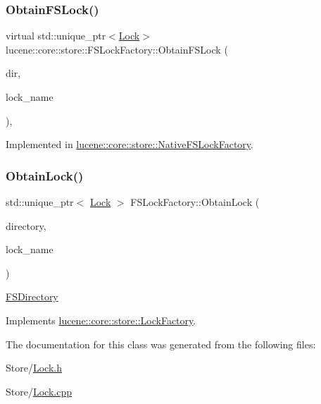 \subsubsection{\texorpdfstring{Obtain\+F\+S\+Lock()}{ObtainFSLock()}}
{\footnotesize\ttfamily virtual std\+::unique\+\_\+ptr$<$\mbox{\hyperlink{classlucene_1_1core_1_1store_1_1Lock}{Lock}}$>$ lucene\+::core\+::store\+::\+F\+S\+Lock\+Factory\+::\+Obtain\+F\+S\+Lock (\begin{DoxyParamCaption}\item[{\mbox{\hyperlink{classlucene_1_1core_1_1store_1_1FSDirectory}{F\+S\+Directory}} \&}]{dir,  }\item[{\mbox{\hyperlink{ZlibCrc32_8h_a2c212835823e3c54a8ab6d95c652660e}{const}} std\+::string \&}]{lock\+\_\+name }\end{DoxyParamCaption})\hspace{0.3cm}{\ttfamily [protected]}, {}}



Implemented in \mbox{\hyperlink{classlucene_1_1core_1_1store_1_1NativeFSLockFactory_af41d7358d9d8b4dab47bc4a443ddd1ee}{lucene\+::core\+::store\+::\+Native\+F\+S\+Lock\+Factory}}.

\mbox{\label{classlucene_1_1core_1_1store_1_1FSLockFactory_a27bb42e846edf5f69913b78ccdf3208e}} 
\subsubsection{\texorpdfstring{Obtain\+Lock()}{ObtainLock()}}
{\footnotesize\ttfamily std\+::unique\+\_\+ptr$<$ \mbox{\hyperlink{classlucene_1_1core_1_1store_1_1Lock}{Lock}} $>$ F\+S\+Lock\+Factory\+::\+Obtain\+Lock (\begin{DoxyParamCaption}\item[{\mbox{\hyperlink{classlucene_1_1core_1_1store_1_1Directory}{Directory}} \&}]{directory,  }\item[{\mbox{\hyperlink{ZlibCrc32_8h_a2c212835823e3c54a8ab6d95c652660e}{const}} std\+::string \&}]{lock\+\_\+name }\end{DoxyParamCaption})\hspace{0.3cm}{\ttfamily [virtual]}}

\mbox{\hyperlink{classlucene_1_1core_1_1store_1_1FSDirectory}{F\+S\+Directory}} 

Implements \mbox{\hyperlink{classlucene_1_1core_1_1store_1_1LockFactory_a46f215414ef4714b6dc3298ddbd352f8}{lucene\+::core\+::store\+::\+Lock\+Factory}}.



The documentation for this class was generated from the following files\+:\begin{DoxyCompactItemize}
\item 
Store/\mbox{\hyperlink{Lock_8h}{Lock.\+h}}\item 
Store/\mbox{\hyperlink{Lock_8cpp}{Lock.\+cpp}}\end{DoxyCompactItemize}
